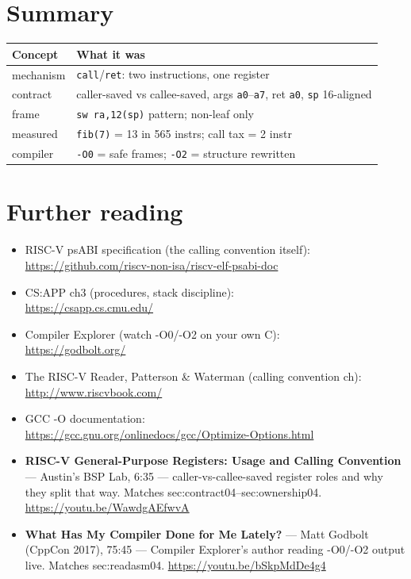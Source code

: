 \section{Summary}
\label{sec:summary04}
\begin{tabularx}{\linewidth}{@{}l X@{}}
\toprule
\textbf{Concept} & \textbf{What it was} \\
\midrule
mechanism & \texttt{call}/\texttt{ret}: two instructions, one register \\
contract & caller-saved vs callee-saved, args \texttt{a0}--\texttt{a7},
 ret \texttt{a0}, \texttt{sp} 16-aligned \\
frame & \texttt{sw ra,12(sp)} pattern; non-leaf only \\
measured & \texttt{fib(7)} = 13 in 565 instrs; call tax = 2 instr \\
compiler & \texttt{-O0} = safe frames; \texttt{-O2} = structure rewritten \\
\bottomrule
\end{tabularx}

\section*{Further reading}
\label{sec:further04}
\begin{itemize}
\item RISC-V psABI specification (the calling convention itself):\\
      \url{https://github.com/riscv-non-isa/riscv-elf-psabi-doc}
\item CS:APP ch3 (procedures, stack discipline):\\
      \url{https://csapp.cs.cmu.edu/}
\item Compiler Explorer (watch -O0/-O2 on your own C):\\
      \url{https://godbolt.org/}
\item The RISC-V Reader, Patterson \& Waterman (calling convention ch):\\
      \url{http://www.riscvbook.com/}
\item GCC -O documentation:\\
      \url{https://gcc.gnu.org/onlinedocs/gcc/Optimize-Options.html}
\end{itemize}

\begin{rulebox}
\begin{itemize}
\item \textbf{RISC-V General-Purpose Registers: Usage and Calling
      Convention} --- Austin's BSP Lab, 6:35 --- caller-vs-callee-saved
      register roles and why they split that way. Matches
      sec:contract04--sec:ownership04. \url{https://youtu.be/WawdgAEfwvA}
\item \textbf{What Has My Compiler Done for Me Lately?} ---
      Matt Godbolt (CppCon 2017), 75:45 --- Compiler Explorer's author
      reading -O0/-O2 output live. Matches sec:readasm04.
      \url{https://youtu.be/bSkpMdDe4g4}
\end{itemize}
\end{rulebox}

